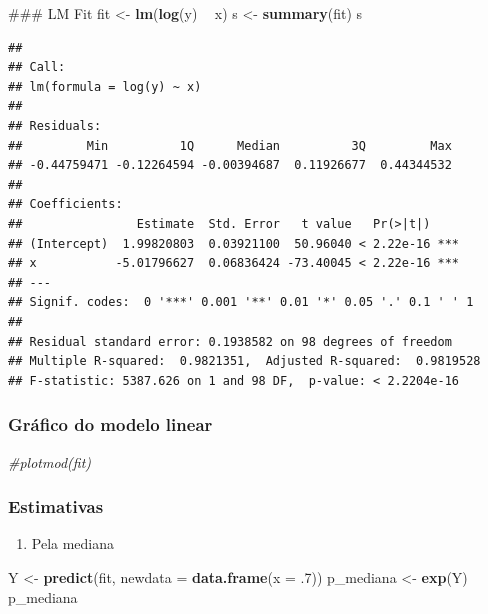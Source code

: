 \documentclass[a4paper]{article}
\newenvironment{Shaded}{\begin{snugshade}}{\end{snugshade}}
\newcommand{\KeywordTok}[1]{\textcolor[rgb]{0.13,0.29,0.53}{\textbf{#1}}}
\newcommand{\DataTypeTok}[1]{\textcolor[rgb]{0.13,0.29,0.53}{#1}}
\newcommand{\DecValTok}[1]{\textcolor[rgb]{0.00,0.00,0.81}{#1}}
\newcommand{\StringTok}[1]{\textcolor[rgb]{0.31,0.60,0.02}{#1}}
\newcommand{\CommentTok}[1]{\textcolor[rgb]{0.56,0.35,0.01}{\textit{#1}}}
\newcommand{\OperatorTok}[1]{\textcolor[rgb]{0.81,0.36,0.00}{\textbf{#1}}}
\newcommand{\NormalTok}[1]{#1}
\providecommand{\tightlist}{%
  \setlength{\itemsep}{0pt}\setlength{\parskip}{0pt}}
\begin{document}
\begin{Shaded}
\begin{Highlighting}[]
\NormalTok{### LM Fit}
\NormalTok{fit <-}\StringTok{ }\KeywordTok{lm}\NormalTok{(}\KeywordTok{log}\NormalTok{(y) }\OperatorTok{~}\StringTok{ }\NormalTok{x)}
\NormalTok{s <-}\StringTok{ }\KeywordTok{summary}\NormalTok{(fit)}
\NormalTok{s}
\end{Highlighting}
\end{Shaded}

\begin{verbatim}
## 
## Call:
## lm(formula = log(y) ~ x)
## 
## Residuals:
##         Min          1Q      Median          3Q         Max 
## -0.44759471 -0.12264594 -0.00394687  0.11926677  0.44344532 
## 
## Coefficients:
##                Estimate  Std. Error   t value   Pr(>|t|)    
## (Intercept)  1.99820803  0.03921100  50.96040 < 2.22e-16 ***
## x           -5.01796627  0.06836424 -73.40045 < 2.22e-16 ***
## ---
## Signif. codes:  0 '***' 0.001 '**' 0.01 '*' 0.05 '.' 0.1 ' ' 1
## 
## Residual standard error: 0.1938582 on 98 degrees of freedom
## Multiple R-squared:  0.9821351,  Adjusted R-squared:  0.9819528 
## F-statistic: 5387.626 on 1 and 98 DF,  p-value: < 2.2204e-16
\end{verbatim}

\subsubsection{Gráfico do modelo linear}\label{grafico-do-modelo-linear}

\begin{Shaded}
\begin{Highlighting}[]
\CommentTok{#plotmod(fit)}
\end{Highlighting}
\end{Shaded}

\subsubsection{Estimativas}\label{estimativas}

\begin{enumerate}
\def\labelenumi{\alph{enumi}.}
\tightlist
\item
  Pela mediana
\end{enumerate}

\begin{Shaded}
\begin{Highlighting}[]
\NormalTok{Y <-}\StringTok{ }\KeywordTok{predict}\NormalTok{(fit, }\DataTypeTok{newdata =} \KeywordTok{data.frame}\NormalTok{(}\DataTypeTok{x =}\NormalTok{ .}\DecValTok{7}\NormalTok{))}
\NormalTok{p_mediana <-}\StringTok{ }\KeywordTok{exp}\NormalTok{(Y)}
\NormalTok{p_mediana}
\end{Highlighting}
\end{Shaded}
\end{document}
